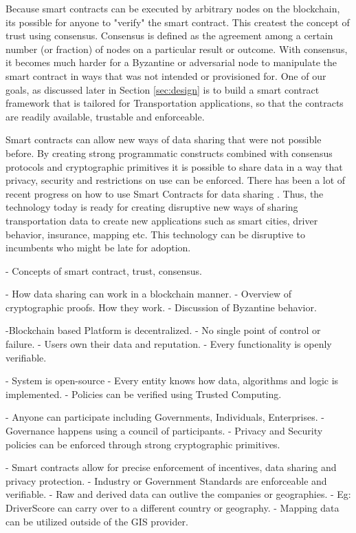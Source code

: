 Because smart contracts can be executed by arbitrary nodes on the blockchain, its possible for anyone to "verify" the
smart contract. This createst the concept of trust using consensus. Consensus is defined as the agreement among a
certain number (or fraction) of nodes on a particular result or outcome. With consensus, it becomes much harder for a
Byzantine or adversarial node \cite{lamport_byz} to manipulate the smart contract in ways that was not intended or
provisioned for. One of our goals, as discussed later in Section \ref{sec:design} is to build a smart contract framework
that is tailored for Transportation applications, so that the contracts are readily available, trustable and
enforceable. 

Smart contracts can allow new ways of data sharing that were not possible before. By creating strong programmatic
constructs combined with consensus protocols and cryptographic primitives it is possible to share data in a way that
privacy, security and restrictions on use can be enforced. There has been a lot of recent progress on how to use Smart
Contracts for data sharing \cite{liu_2018}. Thus, the technology today is ready for creating disruptive new ways of
sharing transportation data to create new applications such as smart cities, driver behavior, insurance, mapping etc.
This technology can be disruptive to incumbents who might be late for adoption.

- Concepts of smart contract, trust, consensus.

- How data sharing can work in a blockchain manner. 
- Overview of cryptographic proofs. How they work.
- Discussion of Byzantine behavior.

-Blockchain based Platform is decentralized.
    - No single point of control or failure.
    - Users own their data and reputation.
    - Every functionality is openly verifiable.

- System is open-source
 - Every entity knows how data, algorithms and logic is implemented.
 - Policies can be verified using Trusted Computing.

- Anyone can participate including Governments, Individuals, Enterprises.
- Governance happens using a council of participants.
- Privacy and Security policies can be enforced through strong cryptographic primitives.


- Smart contracts allow for precise enforcement of incentives, data sharing and privacy protection.
- Industry or Government Standards are enforceable and verifiable.
- Raw and derived data can outlive the companies or geographies.
- Eg: DriverScore can carry over to a different country or geography.
- Mapping data can be utilized outside of the GIS provider.



